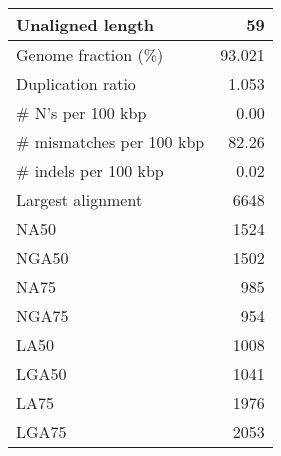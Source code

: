 \documentclass[12pt,a4paper]{article}
\begin{document}
\begin{table}[ht]
\begin{center}
\begin{tabular}{|l*{1}{|r}|}
Unaligned length & 59 \\ \hline
Genome fraction (\%) & 93.021 \\ \hline
Duplication ratio & 1.053 \\ \hline
\# N's per 100 kbp & 0.00 \\ \hline
\# mismatches per 100 kbp & 82.26 \\ \hline
\# indels per 100 kbp & 0.02 \\ \hline
Largest alignment & 6648 \\ \hline
NA50 & 1524 \\ \hline
NGA50 & 1502 \\ \hline
NA75 & 985 \\ \hline
NGA75 & 954 \\ \hline
LA50 & 1008 \\ \hline
LGA50 & 1041 \\ \hline
LA75 & 1976 \\ \hline
LGA75 & 2053 \\ \hline
\end{tabular}
\end{center}
\end{table}
\end{document}
